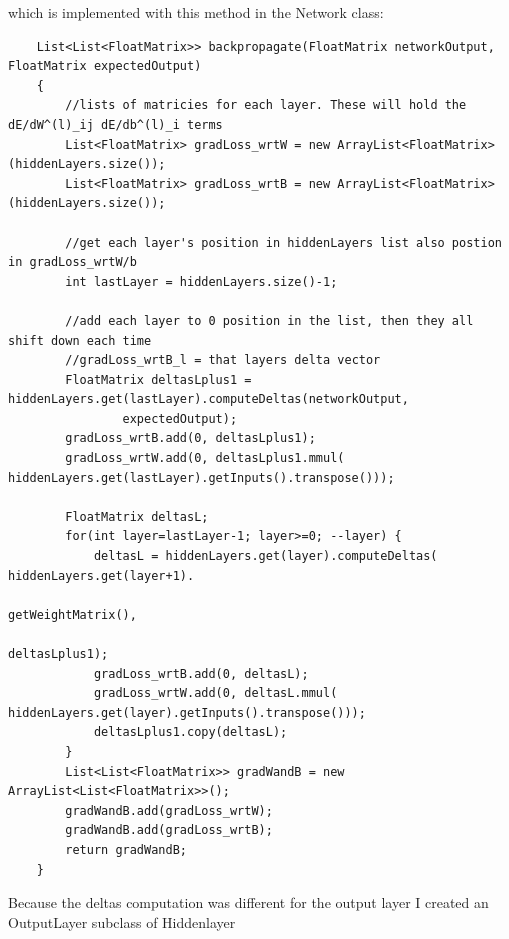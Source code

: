 \documentclass[11pt]{article} %
\begin{document}
which is implemented with this method in the Network class:

\begin{lstlisting}
    List<List<FloatMatrix>> backpropagate(FloatMatrix networkOutput, FloatMatrix expectedOutput)
    {
        //lists of matricies for each layer. These will hold the dE/dW^(l)_ij dE/db^(l)_i terms
        List<FloatMatrix> gradLoss_wrtW = new ArrayList<FloatMatrix>(hiddenLayers.size());
        List<FloatMatrix> gradLoss_wrtB = new ArrayList<FloatMatrix>(hiddenLayers.size());
        
        //get each layer's position in hiddenLayers list also postion in gradLoss_wrtW/b
        int lastLayer = hiddenLayers.size()-1;
        
        //add each layer to 0 position in the list, then they all shift down each time
        //gradLoss_wrtB_l = that layers delta vector
        FloatMatrix deltasLplus1 = hiddenLayers.get(lastLayer).computeDeltas(networkOutput, 
				expectedOutput);
        gradLoss_wrtB.add(0, deltasLplus1);
        gradLoss_wrtW.add(0, deltasLplus1.mmul( hiddenLayers.get(lastLayer).getInputs().transpose()));
        
        FloatMatrix deltasL;
        for(int layer=lastLayer-1; layer>=0; --layer) {
            deltasL = hiddenLayers.get(layer).computeDeltas( hiddenLayers.get(layer+1).
																																						getWeightMatrix(),
                                                             deltasLplus1);
            gradLoss_wrtB.add(0, deltasL);
            gradLoss_wrtW.add(0, deltasL.mmul( hiddenLayers.get(layer).getInputs().transpose()));
            deltasLplus1.copy(deltasL);
        }
        List<List<FloatMatrix>> gradWandB = new ArrayList<List<FloatMatrix>>();
        gradWandB.add(gradLoss_wrtW);
        gradWandB.add(gradLoss_wrtB);
        return gradWandB;
    }
\end{lstlisting}

Because the deltas computation was different for the output layer I created an OutputLayer subclass of Hiddenlayer 
\end{document}

